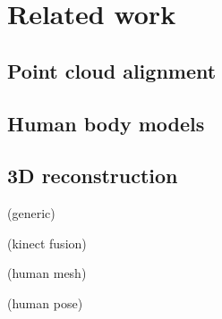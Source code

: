 \chapter{Related work}


\section{Point cloud alignment}
\citep{huang2011visual}
\citep{rusinkiewicz2001efficient}
\citep{tamaki2010softassign}
\citep{granger2006multi}
\citep{tykkala2011direct}

\section{Human body models}
\citep{anguelov2005scape}
\citep{baek2012parametric}

\section{3D reconstruction}
(generic)
\citep{fabio2003point}

(kinect fusion)
\citep{izadi2011kinectfusion}
\citep{newcombe2011kinectfusion}
\citep{Whelan12rssw}

(human mesh)
\citep{weiss2011home}
\citep{schneider2010fitting}
\citep{ahmed2005automatic}
\citep{tongscanning}
\citep{charpentier2011accurate}
\citep{hirshbergc2011evaluating}

(human pose)
\citep{baak2011data}
